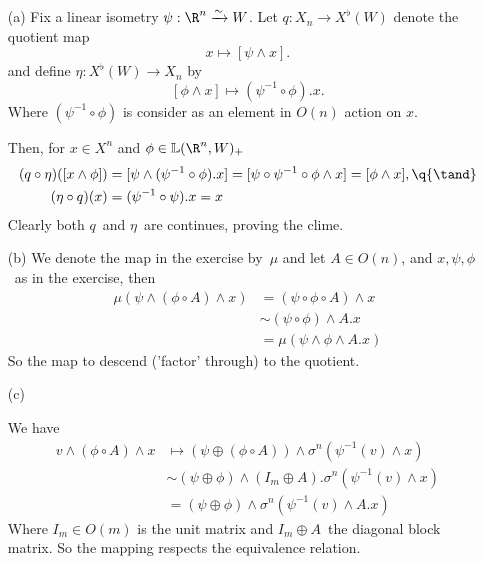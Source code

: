 
\def \L{\mathbb{L}}
\def \simto{\xrightarrow{\sim}}
\def \O{\mathcal{O}}


\mmaketitle

\begin{exercise}[1]\ 
\end{exercise}

\begin{exercise}[2]\ 
\begin{enumerate}
\item[(a)]
Fix a linear isometry $\psi: \R^n \simto W$. Let 
$q : X_n \to X^\flat(W)$ denote the quotient map 
\[ x \mapsto [\psi \wedge x]. \]
and define $\eta: X^\flat(W) \to X_n$ by 
\[ [\phi \wedge x] \mapsto (\psi^{-1} \circ \phi) . x. \]
Where $(\psi^{-1} \circ \phi)$ is consider as an element in $O(n)$ action on
$x$.

Then, for $x \in X^n$ and $\phi \in \L(\R^n, W)_+$ 
\begin{align*}
(q \circ \eta) ([x \wedge \phi]) 
&= [\psi \wedge (\psi^{-1} \circ \phi) . x ] 
= [\psi \circ \psi^{-1} \circ \phi \wedge x]
= [\phi \wedge x], \q{\tand} \\
(\eta \circ q) (x) 
&= (\psi^{-1} \circ \psi) . x 
= x
\end{align*}
Clearly both $q$ and $\eta$ are continues, proving the clime.

\item[(b)]
We denote the map in the exercise by $\mu$ and
let $A \in O(n)$, and $x, \psi, \phi$ as in the exercise, then 
\begin{align*}
\mu( \psi \wedge (\phi \circ A) \wedge x ) 
&= (\psi \circ \phi \circ A) \wedge x  \\
&\sim (\psi \circ \phi) \wedge A . x \\
&= \mu( \psi \wedge \phi \wedge A . x ) 
\end{align*}
So the map to descend ('factor' through) to the quotient. 

\item[(c)]

We have 
\begin{align*}
v \wedge (\phi \circ A) \wedge x 
&\mapsto (\psi \oplus (\phi \circ A)) \wedge \sigma^n(\psi^{-1}(v) \wedge x) \\
&\sim (\psi \oplus \phi) \wedge (I_m\oplus A) . \sigma^n (\psi^{-1}(v) \wedge x)
\\
&= (\psi \oplus \phi) \wedge \sigma^n (\psi^{-1}(v) \wedge A.x)
\end{align*}
Where $I_m \in O(m)$ is the unit matrix and $I_m\oplus A$ the diagonal block
matrix. So the mapping respects the equivalence relation. 


\end{enumerate}
\end{exercise}
